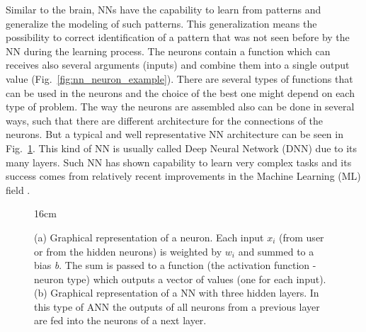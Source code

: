 Similar to the brain, NNs have the capability to learn from patterns and generalize the modeling of such patterns. This generalization means the possibility to correct identification of a pattern that was not seen before by the NN during the learning process. The neurons contain a function which can receives also several arguments (inputs) and combine them into a single output value (Fig.~\ref{fig:nn_neuron_example}). There are several types of functions that can be used in the neurons and the choice of the best one might depend on each type of problem. The way the neurons are assembled also can be done in several ways, such that there are different architecture for the connections of the neurons. But a typical and well representative NN architecture can be seen in Fig.~\ref{fig:neuron_and_dnn}. This kind of NN is usually called Deep Neural Network (DNN) due to its many layers. Such NN has shown capability to learn very complex tasks and its success comes from relatively recent improvements in the Machine Learning (ML) field \cite{bib:GlorotAndBendio2010,bib:NairAndHinton2010,bib:Zeiler_et_al2013}.

\begin{figure}[hbtp]{16cm}
	\caption{(a) Graphical representation of a neuron. Each input \textit{$x_i$} (from user or from the hidden neurons) is weighted by \textit{$w_i$} and summed to a bias \textit{b}. The sum is passed to a function (the activation function - neuron type) which outputs a vector of values (one for each input). (b) Graphical representation of a NN with three hidden layers. In this type of ANN the outputs of all neurons from a previous layer are fed into the neurons of a next layer.}
	\centering
	\quad
	\quad
	\quad
	\label{fig:neuron_and_dnn}
\end{figure}

